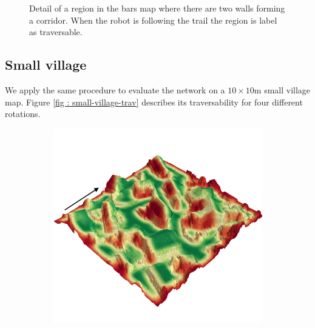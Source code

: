 \documentclass[../document.tex]{subfiles}
\begin{document}
\begin{figure} [htbp]
\begin{subfigure}[b]{0.23\textwidth}
  \end{subfigure}
  \caption{Detail of a region in the bars map where there are two walls forming a corridor. When the robot is  following the trail the region is label as traversable.}
  \label{fig : bars-tunnel-trav}
  \end{figure}

\subsection{Small village}
We apply the same procedure to evaluate the network on a $10\times10$m small village map. Figure \ref{fig : small-village-trav} describes its traversability for four different rotations.

\begin{figure} [htbp]
  \centering
  \begin{subfigure}[b]{0.45\textwidth}
    \includegraphics[width=\linewidth]{../img/4/traversability/sullens/-270.png} 
  \end{subfigure}
  \begin{subfigure}[b]{0.45\textwidth}

\end{subfigure}
\end{figure}
\end{document}

